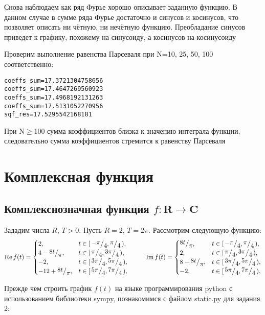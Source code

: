\documentclass[a4paper, 16pt]{article}
\newcommand{\frc}[2]{\raisebox{2pt}{$#1$}\big/\raisebox{-3pt}{$#2$}}
\begin{document}
\noindent Снова наблюдаем как ряд Фурье хорошо описывает заданную функцию. В данном случае
в сумме ряда Фурье достаточно и синусов и косинусов, что позволяет описать ни чётную, ни 
нечётную функцию. Преобладание синусов приведет к графику, похожему на синусоиду, а косинусов
на косинусоиду


\noindent Проверим выполнение равенства Парсеваля при N=10, 25, 50, 100 соответственно:
\begin{lstlisting}
coeffs_sum=17.3721304758656
coeffs_sum=17.4647269560923
coeffs_sum=17.4968192131263
coeffs_sum=17.5131052270956
sqf_res=17.5295542168181
\end{lstlisting}


\noindent При N$\geq$100 сумма коэффициентов близка к значению
интеграла функции, следовательно сумма коэффициентов стремится к равенству Парсеваля


\newpage
\section{Комплексная функция}
\subsection{Комплекснозначная функция \texorpdfstring{$f:\mathbf{R}\rightarrow\mathbf{C}$}{Lg}}
\noindent Зададим числа $R,\,T>0$. Пусть $R=2,\,T=2\pi$. Рассмотрим следующую функцию:
$$
\text{Re}\,f(t)=
\begin{cases}
    2, & t\in[\,-\frc{\pi}{4},\frc{\pi}{4}\,),\\
    4-\frc{8t}{\pi}, & t\in[\,\frc{\pi}{4},\frc{3\pi}{4}\,),\\
    -2, & t\in[\,\frc{3\pi}{4},\frc{5\pi}{4}\,),\\
    -12+\frc{8t}{\pi}, & t\in[\,\frc{5\pi}{4},\frc{7\pi}{4}\,),
\end{cases}
\,\,\,\,\,\,\,\,\,\,\,\,\,\,\,\,
\text{Im}\,f(t)=
\begin{cases}
    \frc{8t}{\pi}, & t\in[\,-\frc{\pi}{4},\frc{\pi}{4}\,),\\
    2, & t\in[\,\frc{\pi}{4},\frc{3\pi}{4}\,),\\
    8-\frc{8t}{\pi}, & t\in[\,\frc{3\pi}{4},\frc{5\pi}{4}\,),\\
    -2, & t\in[\,\frc{5\pi}{4},\frc{7\pi}{4}\,),
\end{cases}
$$


\noindent Прежде чем строить график $f(t)$ на языке программирования python с
использованием библиотеки sympy, познакомимся с файлом static.py для задания 2:
\end{document}
